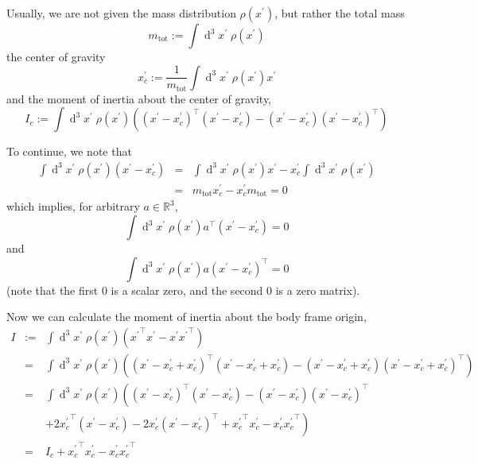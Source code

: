 \documentclass[a4paper]{article}
\begin{document}
Usually, we are not given the mass distribution $\rho(x^\prime)$, but rather the total mass
\begin{equation}
m_\mathrm{tot} := \int \operatorname{d}^3\!x^\prime\; \rho(x^\prime)
\end{equation}
the center of gravity
\begin{equation}
\label{eqn:xpcdef}
x_c^\prime := \frac{1}{m_\mathrm{tot}} \int \operatorname{d}^3\!x^\prime\; \rho(x^\prime) x^\prime
\end{equation}
and the moment of inertia about the center of gravity,
\begin{equation}
I_c := \int \operatorname{d}^3\!x^\prime\; \rho(x^\prime) \left( (x^\prime - x_c^\prime)^\top (x^\prime - x_c^\prime) - (x^\prime - x_c^\prime)(x^\prime - x_c^\prime)^\top \right)
\end{equation}

To continue, we note that
\begin{eqnarray}
\nonumber \int \operatorname{d}^3\!x^\prime\; \rho(x^\prime) (x^\prime - x_c^\prime)
&=& \int \operatorname{d}^3\!x^\prime\; \rho(x^\prime) x^\prime
- x_c^\prime \int \operatorname{d}^3\!x^\prime\; \rho(x^\prime)\\
&=& m_\mathrm{tot} x_c^\prime - x_c^\prime m_\mathrm{tot} = 0
\end{eqnarray}
which implies, for arbitrary $a \in \mathbb{R}^3$,
\begin{equation}
\int \operatorname{d}^3\!x^\prime\; \rho(x^\prime) a^\top (x^\prime - x_c^\prime) = 0
\end{equation}
and
\begin{equation}
\int \operatorname{d}^3\!x^\prime\; \rho(x^\prime) a (x^\prime - x_c^\prime)^\top = 0
\end{equation}
(note that the first 0 is a scalar zero, and the second 0 is a zero matrix).

Now we can calculate the moment of inertia about the body frame origin,
\begin{eqnarray}
\label{eqn:i}
\nonumber I &:=& \int \operatorname{d}^3\!x^\prime\; \rho(x^\prime) \left( {x^\prime}^\top x^\prime - x^\prime {x^\prime}^\top \right)\\
\nonumber&=& \int \operatorname{d}^3\!x^\prime\; \rho(x^\prime) \left( (x^\prime - x_c^\prime + x_c^\prime)^\top (x^\prime - x_c^\prime + x_c^\prime) - (x^\prime - x_c^\prime + x_c^\prime)(x^\prime - x_c^\prime + x_c^\prime)^\top \right)\\
\nonumber&=& \int \operatorname{d}^3\!x^\prime\; \rho(x^\prime) \left( (x^\prime - x_c^\prime)^\top (x^\prime - x_c^\prime) - (x^\prime - x_c^\prime)(x^\prime - x_c^\prime)^\top \right.\\
\nonumber && \left. + 2 {x_c^\prime}^\top (x^\prime - x_c^\prime) - 2 x_c^\prime (x^\prime - x_c^\prime)^\top + {x_c^\prime}^\top x_c^\prime - x_c^\prime {x_c^\prime}^\top \right)\\
&=& I_c + {x_c^\prime}^\top x_c^\prime - x_c^\prime {x_c^\prime}^\top
\end{eqnarray}
\end{document}
